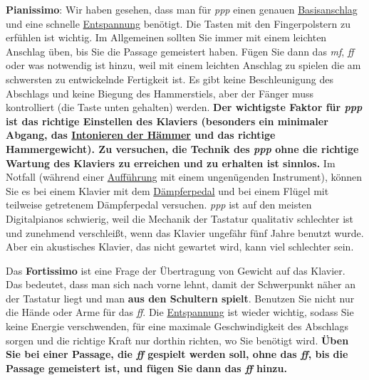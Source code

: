 \textbf{Pianissimo}:
Wir haben gesehen, dass man für \textit{ppp} einen genauen \hyperref[c1iii1a1]{Basisanschlag} und eine schnelle \hyperref[c1ii14]{Entspannung} benötigt.
Die Tasten mit den Fingerpolstern zu erfühlen ist wichtig.
Im Allgemeinen sollten Sie immer mit einem leichten Anschlag üben, bis Sie die Passage gemeistert haben.
Fügen Sie dann das \textit{mf}, \textit{ff} oder was notwendig ist hinzu, weil mit einem leichten Anschlag zu spielen die am schwersten zu entwickelnde Fertigkeit ist.
Es gibt keine Beschleunigung des Abschlags und keine Biegung des Hammerstiels, aber der Fänger muss kontrolliert (die Taste unten gehalten) werden.
\textbf{Der wichtigste Faktor für \textit{ppp} ist das richtige Einstellen des Klaviers (besonders ein minimaler Abgang, das \hyperref[c2_7_hamm]{Intonieren der Hämmer} und das richtige Hammergewicht).
Zu versuchen, die Technik des \textit{ppp} ohne die richtige Wartung des Klaviers zu erreichen und zu erhalten ist sinnlos.}
Im Notfall (während einer \hyperref[c1iii14]{Aufführung} mit einem ungenügenden Instrument), können Sie es bei einem Klavier mit dem \hyperref[c1ii24]{Dämpferpedal} und bei einem Flügel mit teilweise getretenem Dämpferpedal versuchen.
\textit{ppp} ist auf den meisten Digitalpianos schwierig, weil die Mechanik der Tastatur qualitativ schlechter ist und zunehmend verschleißt, wenn das Klavier ungefähr fünf Jahre benutzt wurde.
Aber ein akustisches Klavier, das nicht gewartet wird, kann viel schlechter sein.

Das \textbf{Fortissimo} ist eine Frage der Übertragung von Gewicht auf das Klavier.
Das bedeutet, dass man sich nach vorne lehnt, damit der Schwerpunkt näher an der Tastatur liegt und man \textbf{aus den Schultern spielt}.
Benutzen Sie nicht nur die Hände oder Arme für das \textit{ff}.
Die \hyperref[c1ii14]{Entspannung} ist wieder wichtig, sodass Sie keine Energie verschwenden, für eine maximale Geschwindigkeit des Abschlags sorgen und die richtige Kraft nur dorthin richten, wo Sie benötigt wird.
\textbf{Üben Sie bei einer Passage, die \textit{ff} gespielt werden soll, ohne das \textit{ff}, bis die Passage gemeistert ist, und fügen Sie dann das \textit{ff} hinzu.}

